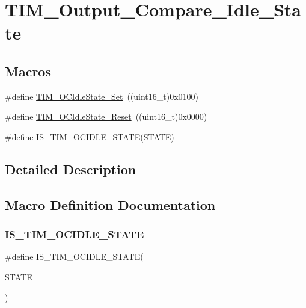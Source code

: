 \hypertarget{group___t_i_m___output___compare___idle___state}{}\section{T\+I\+M\+\_\+\+Output\+\_\+\+Compare\+\_\+\+Idle\+\_\+\+State}
\label{group___t_i_m___output___compare___idle___state}
\subsection*{Macros}
\begin{DoxyCompactItemize}
\item 
\#define \mbox{\hyperlink{group___t_i_m___output___compare___idle___state_ga86d8f895a1ec584323f6c02c7edfad4c}{T\+I\+M\+\_\+\+O\+C\+Idle\+State\+\_\+\+Set}}~((uint16\+\_\+t)0x0100)
\item 
\#define \mbox{\hyperlink{group___t_i_m___output___compare___idle___state_gace5465bc9e90ba7862b3af9e6cc9b97e}{T\+I\+M\+\_\+\+O\+C\+Idle\+State\+\_\+\+Reset}}~((uint16\+\_\+t)0x0000)
\item 
\#define \mbox{\hyperlink{group___t_i_m___output___compare___idle___state_ga69c62dcc15f9d39108b19b64205d689e}{I\+S\+\_\+\+T\+I\+M\+\_\+\+O\+C\+I\+D\+L\+E\+\_\+\+S\+T\+A\+TE}}(S\+T\+A\+TE)
\end{DoxyCompactItemize}


\subsection{Detailed Description}


\subsection{Macro Definition Documentation}
\mbox{\label{group___t_i_m___output___compare___idle___state_ga69c62dcc15f9d39108b19b64205d689e}} 
\subsubsection{\texorpdfstring{IS\_TIM\_OCIDLE\_STATE}{IS\_TIM\_OCIDLE\_STATE}}
{\footnotesize\ttfamily \#define I\+S\+\_\+\+T\+I\+M\+\_\+\+O\+C\+I\+D\+L\+E\+\_\+\+S\+T\+A\+TE(\begin{DoxyParamCaption}\item[{}]{S\+T\+A\+TE }\end{DoxyParamCaption})}

